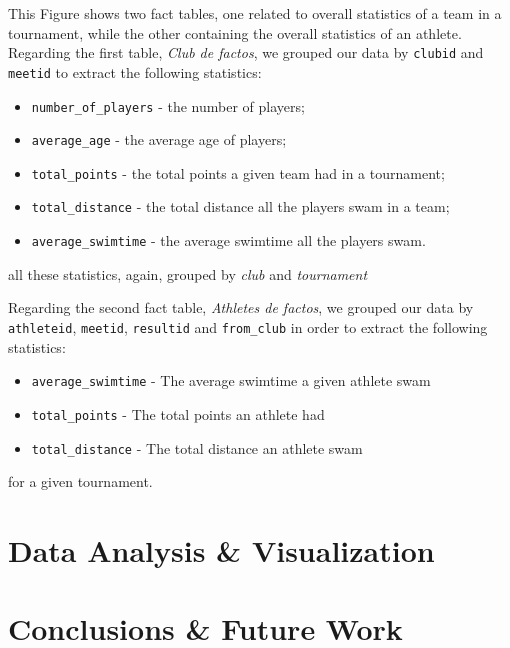 \documentclass[a4paper, 11pt]{article}
\begin{document}
This Figure shows two fact tables, one related to overall statistics of a team in a tournament, while the other containing the overall statistics of an athlete. Regarding the first table, \textit{Club de factos}, we grouped our data by \texttt{clubid} and \texttt{meetid} to extract the following statistics:

\begin{itemize}
    \item \texttt{number\_of\_players} - the number of players;
    
    \item \texttt{average\_age} - the average age of players;
    
    \item \texttt{total\_points} - the total points a given team had in a tournament;
    \item \texttt{total\_distance} - the total distance all the players swam in a team;
    \item \texttt{average\_swimtime} - the average swimtime all the players swam.
\end{itemize}

all these statistics, again, grouped by \textit{club} and \textit{tournament}

Regarding the second fact table, \textit{Athletes de factos}, we grouped our data by \texttt{athleteid}, \texttt{meetid}, \texttt{resultid} and \texttt{from\_club} in order to extract the following statistics:

\begin{itemize}
    \item \texttt{average\_swimtime} - The average swimtime a given athlete swam
    \item \texttt{total\_points} - The total points an athlete had
    \item \texttt{total\_distance} - The total distance an athlete swam
\end{itemize}

for a given tournament.

\pagebreak

\section{Data Analysis \& Visualization} \label{sec:analysis}


\pagebreak

\section{Conclusions \& Future Work} \label{sec:conclusion}
\end{document}
